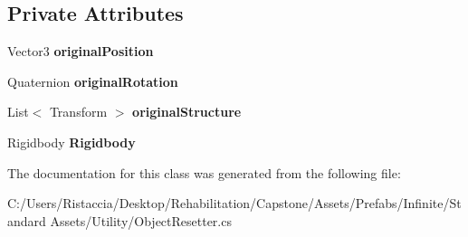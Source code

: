 \subsection*{Private Attributes}
\begin{DoxyCompactItemize}
\item 
\mbox{\label{class_unity_standard_assets_1_1_utility_1_1_object_resetter_ab6ed43deeb18608cb06f674d306fb3d4}} 
Vector3 {\bfseries original\+Position}
\item 
\mbox{\label{class_unity_standard_assets_1_1_utility_1_1_object_resetter_a45ba455d992a428653bc4f816db8fcee}} 
Quaternion {\bfseries original\+Rotation}
\item 
\mbox{\label{class_unity_standard_assets_1_1_utility_1_1_object_resetter_afb10d4b36adfedd3b7487d284067ecf3}} 
List$<$ Transform $>$ {\bfseries original\+Structure}
\item 
\mbox{\label{class_unity_standard_assets_1_1_utility_1_1_object_resetter_a4cc58efe043a2ed96cff3522f942501f}} 
Rigidbody {\bfseries Rigidbody}
\end{DoxyCompactItemize}


The documentation for this class was generated from the following file\+:\begin{DoxyCompactItemize}
\item 
C\+:/\+Users/\+Ristaccia/\+Desktop/\+Rehabilitation/\+Capstone/\+Assets/\+Prefabs/\+Infinite/\+Standard Assets/\+Utility/Object\+Resetter.\+cs\end{DoxyCompactItemize}
